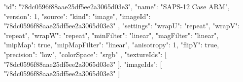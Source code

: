 {
  "id": "78dc0596f88aae25df5ee2a3065d03e3",
  "name": "SAPS-12 Case ARM",
  "version": 1,
  "source": {
    "kind": "image",
    "imageId": "78dc0596f88aae25df5ee2a3065d03e3"
  },
  "settings": {
    "wrapU": "repeat",
    "wrapV": "repeat",
    "wrapW": "repeat",
    "minFilter": "linear",
    "magFilter": "linear",
    "mipMap": true,
    "mipMapFilter": "linear",
    "anisotropy": 1,
    "flipY": true,
    "precision": "low",
    "colorSpace": "srgb"
  },
  "textureIds": [
    "78dc0596f88aae25df5ee2a3065d03e3"
  ],
  "imageIds": [
    "78dc0596f88aae25df5ee2a3065d03e3"
  ]
}
